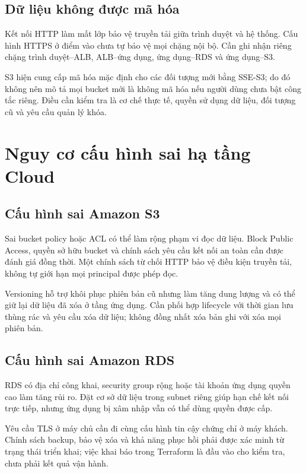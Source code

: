 \subsection{Dữ liệu không được mã hóa}
Kết nối HTTP làm mất lớp bảo vệ truyền tải giữa trình duyệt và hệ thống. Cấu hình HTTPS ở điểm vào chưa tự bảo vệ mọi chặng nội bộ. Cần ghi nhận riêng chặng trình duyệt--ALB, ALB--ứng dụng, ứng dụng--RDS và ứng dụng--S3.

S3 hiện cung cấp mã hóa mặc định cho các đối tượng mới bằng SSE-S3; do đó không nên mô tả mọi bucket mới là không mã hóa nếu người dùng chưa bật công tắc riêng. Điều cần kiểm tra là cơ chế thực tế, quyền sử dụng dữ liệu, đối tượng cũ và yêu cầu quản lý khóa.\cite{sses3}

\section{Nguy cơ cấu hình sai hạ tầng Cloud}
\subsection{Cấu hình sai Amazon S3}
Sai bucket policy hoặc ACL có thể làm rộng phạm vi đọc dữ liệu. Block Public Access, quyền sở hữu bucket và chính sách yêu cầu kết nối an toàn cần được đánh giá đồng thời. Một chính sách từ chối HTTP bảo vệ điều kiện truyền tải, không tự giới hạn mọi principal được phép đọc.

Versioning hỗ trợ khôi phục phiên bản cũ nhưng làm tăng dung lượng và có thể giữ lại dữ liệu đã xóa ở tầng ứng dụng. Cần phối hợp lifecycle với thời gian lưu thùng rác và yêu cầu xóa dữ liệu; không đồng nhất xóa bản ghi với xóa mọi phiên bản.
\subsection{Cấu hình sai Amazon RDS}
RDS có địa chỉ công khai, security group rộng hoặc tài khoản ứng dụng quyền cao làm tăng rủi ro. Đặt cơ sở dữ liệu trong subnet riêng giúp hạn chế kết nối trực tiếp, nhưng ứng dụng bị xâm nhập vẫn có thể dùng quyền được cấp.

Yêu cầu TLS ở máy chủ cần đi cùng cấu hình tin cậy chứng chỉ ở máy khách. Chính sách backup, bảo vệ xóa và khả năng phục hồi phải được xác minh từ trạng thái triển khai; việc khai báo trong Terraform là đầu vào cho kiểm tra, chưa phải kết quả vận hành.
